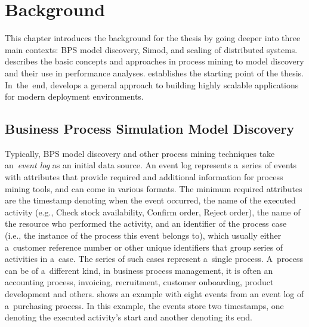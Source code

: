 \documentclass[12pt]{article}
\begin{document}
\newpage
\section{Background} \label{ch:background}

This chapter introduces the background for the thesis by going deeper into three main contexts: BPS model discovery, Simod, and scaling of distributed systems.  describes the basic concepts and approaches in process mining to model discovery and their use in performance analyses.  establishes the starting point of the thesis. In~the~end,  develops a general approach to building highly scalable applications for modern deployment environments.

\subsection{Business Process Simulation Model Discovery\label{ch:background_discovery}}

Typically, BPS model discovery and other process mining techniques take an~\emph{event log} as an initial data source. An event log represents a~series of events with attributes that provide required and additional information for process mining tools, and can come in various formats. The minimum required attributes are the timestamp denoting when the event occurred, the name of the executed activity (e.g., Check stock availability, Confirm order, Reject order), the name of the resource who performed the activity, and an identifier of the process case (i.e., the instance of the process this event belongs to), which usually either a~customer reference number or other unique identifiers that group series of activities in a~case. The series of such cases represent a~single process. A~process can be of a~different kind, in business process management, it is often an accounting process, invoicing, recruitment, customer onboarding, product development and others.  shows an example with eight events from an event log of a~purchasing process. In this example, the events store two timestamps, one denoting the executed activity's start and another denoting its end.
\end{document}

